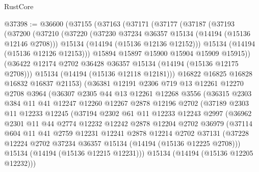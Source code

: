 \begin{lexlean}{RustCore}
\begin{coremodule}
@37398 := @36600
    (@37155
      (@37163
        (@37171
          (@37177
            (@37187
              (@37193
                (@37200
                  (@37210
                    (@37220
                      (@37230 @37234 @36357 @15134 (@14194 (@15136 @12146 @2708)))
                      @15134
                      (@14194 (@15136 @12136 @12152)))
                    @15134
                    (@14194 (@15136 @12126 @12153)))
                  @15894
                  @15897
                  @15900
                  @15904
                  @15909
                  @15915))
              (@36422 @12174 @2702 @36428 @36357 @15134 (@14194 (@15136 @12175 @2708)))
              @15134
              (@14194 (@15136 @12118 @12181)))
            @16822
            @16825
            @16828
            @16832
            @16837
            @21153)
          (@36381
            @12191
            @2306
            @719
            @13
            @12261
            @12270
            @2708
            @3964
            (@36307
              @2305
              @44
              @13
              @12261
              @12268
              @3556
              (@36315
                @2303
                @384
                @11
                @41
                @12247
                @12260
                @12267
                @2878
                @12196
                @2702
                (@37189
                  @2303
                  @11
                  @12233
                  @12245
                  (@37194
                    @2302
                    @61
                    @11
                    @12233
                    @12243
                    @2997
                    (@36962
                      @2301
                      @11
                      @44
                      @2774
                      @12232
                      @12242
                      @2878
                      @12204
                      @2702
                      @36979
                      (@37114
                        @604
                        @11
                        @41
                        @2759
                        @12231
                        @12241
                        @2878
                        @12214
                        @2702
                        @37131
                        (@37228 @12224 @2702 @37234 @36357 @15134 (@14194 (@15136 @12225 @2708)))
                        @15134
                        (@14194 (@15136 @12215 @12231)))
                      @15134
                      (@14194 (@15136 @12205 @12232)))

\end{coremodule}
\end{lexlean}
